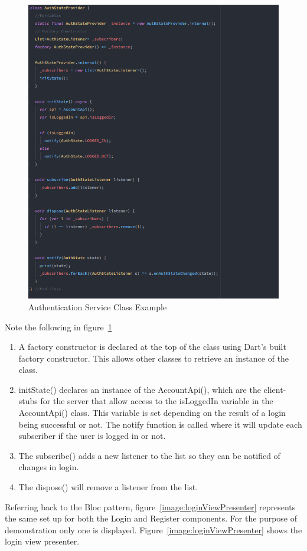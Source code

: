 \begin{figure}[h!]
    \caption{Authentication Service Class Example}
    \label{image:authServiceClass}
    \centering
    \includegraphics[width=1.0\textwidth]{images/authentication_service_class.png}
\end{figure}

Note the following in figure~\ref{image:authServiceClass}
\begin{enumerate}
    \item A factory constructor is declared at the top of the class using Dart's built factory constructor. This allows other classes to retrieve an instance of the class.
    \item initState() declares an instance of the AccountApi(), which are the client-stubs for the server that allow access to the isLoggedIn variable in the AccountApi() class. This variable is set depending on the result of a login being successful or not. The notify function is called where it will update each subscriber if the user is logged in or not.
    \item The subscribe() adds a new listener to the list so they can be notified of changes in login.
    \item The dispose() will remove a listener from the list.
\end{enumerate}
Referring back to the Bloc pattern, figure~\ref{image:loginViewPresenter} represents the same set up for both the Login and Register components. For the purpose of demonstration only one is displayed. Figure~\ref{image:loginViewPresenter} shows the login view presenter.

